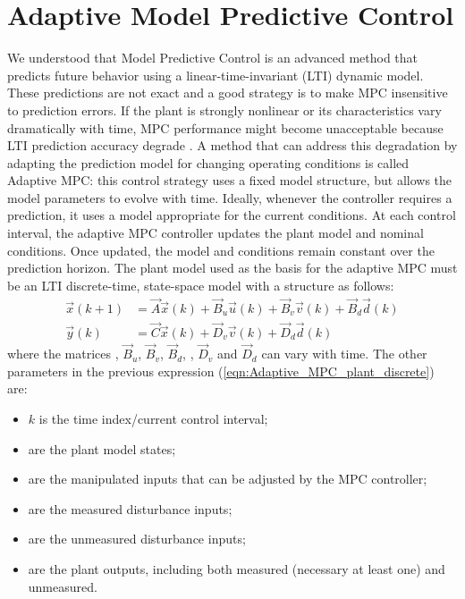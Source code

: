 \section{Adaptive Model Predictive Control}
We understood that Model Predictive Control is an advanced method that predicts future behavior using a linear-time-invariant (LTI) dynamic model. These predictions are not exact and a good strategy is to make MPC insensitive to prediction errors. If the plant is strongly nonlinear or its characteristics vary dramatically with time, MPC performance might become unacceptable because LTI prediction accuracy degrade \cite{mpctoolbox}. A method that can address this degradation by adapting the prediction model for changing operating conditions is called Adaptive MPC: this control strategy uses a fixed model structure, but allows the model parameters to evolve with time. Ideally, whenever the controller requires a prediction, it uses a model appropriate for the current conditions. At each control interval, the adaptive MPC controller updates the plant model and nominal conditions. Once updated, the model and conditions remain constant over the prediction horizon. The plant model used as the basis for the adaptive MPC must be an LTI discrete-time, state-space model with a structure as follows:
\begin{equation}
\label{eqn:Adaptive_MPC_plant_discrete}
\begin{aligned}
\vec{x}(k+1)&=\vec{A}\vec{x}(k)+ \vec{B}_u \vec{u}(k)+\vec{B}_v \vec{v}(k)+\vec{B}_d \vec{d}(k)\\
\vec{y}(k)&=\vec{C}\vec{x}(k) + \vec{D}_v \vec{v}(k)+ \vec{D}_d \vec{d}(k)
\end{aligned}
\end{equation}
where the matrices , $\vec{B}_u$, $\vec{B}_v$, $\vec{B}_d$, , $\vec{D}_v$ and $\vec{D}_d$ can vary with time. The other parameters in the previous expression (\ref{eqn:Adaptive_MPC_plant_discrete}) are:
\begin{itemize}
	\item $k$ is the time index/current control interval;
	\item {} are the plant model states;
	\item {} are the manipulated inputs that can be adjusted by the MPC controller;
	\item {} are the measured disturbance inputs;
	\item {} are the unmeasured disturbance inputs;
	\item {} are the plant outputs, including both measured (necessary at least one) and unmeasured.
\end{itemize}
